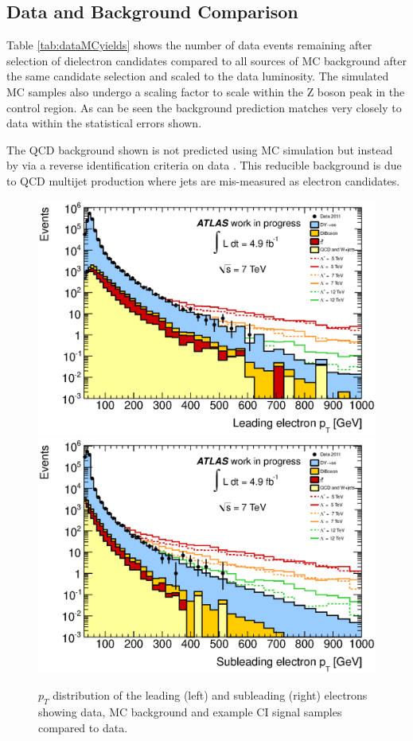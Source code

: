 \newpage
\subsection{Data and Background Comparison}
Table \ref{tab:dataMCyields} shows the number of data events remaining after selection of dielectron candidates compared to all sources of MC background after the same candidate selection and scaled to the data luminosity.  The simulated MC samples also undergo a scaling factor to scale within the Z boson peak in the control region. As can be seen the background prediction matches very closely to data within the statistical errors shown.

The QCD background shown is not predicted using MC simulation but instead by via a reverse identification criteria on data \cite{QCD}. This reducible background is due to QCD multijet production where jets are mis-measured as electron candidates.



\begin{figure}[h!]
\centering
\includegraphics[width=0.49\linewidth]{images/lead_pT.eps}
\includegraphics[width=0.49\linewidth]{images/sub_pT.eps}
\caption{$p_{T}$ distribution of the leading (left) and subleading (right) electrons showing data, MC background and example CI signal samples compared to data.}
\label{fig:CIpT}
\end{figure}

